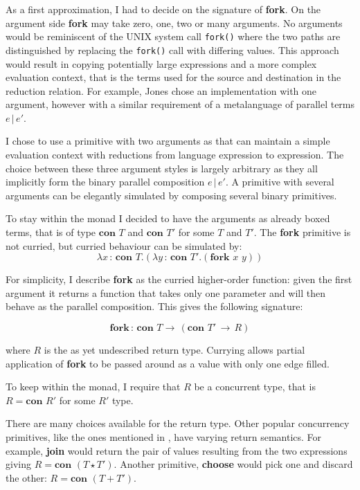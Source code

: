 \documentclass[12pt,twoside,notitlepage]{report}
\theoremstyle{plain}%
\theoremstyle{definition}
\theoremstyle{remark}
\begin{document}
As a first approximation, I had to decide on the signature of \textbf{fork}. On the argument side \textbf{fork} may take zero, one, two or many arguments. No arguments would be reminiscent of the UNIX system call \verb|fork()| where the two paths are distinguished by replacing the \verb|fork()| call with differing values. This approach would result in copying potentially large expressions and a more complex evaluation context, that is the terms used for the source and destination in the reduction relation. For example, Jones\cite{hoareetal2001tackling} chose an implementation with one argument, however with a similar requirement of a metalanguage of parallel terms $ e \, | \, e' $. 


I chose to use a primitive with two arguments as that can maintain a simple evaluation context with reductions from language expression to expression. The choice between these three argument styles is largely arbitrary as they all implicitly form the binary parallel composition $ e \, | \, e' $. A primitive with several arguments can be elegantly simulated by composing several binary primitives.

To stay within the monad I decided to have the arguments as already boxed terms, that is of type $ \textbf{con } T $ and $ \textbf{con } T' $ for some $ T$ and $T' $. The \textbf{fork} primitive is not curried, but curried behaviour can be simulated by:
\[ \lambda x \,:\,\textbf{con }T.(\lambda y \,:\,\textbf{con }T'.(\textbf{fork}\,\,x\,\,y)) \]

For simplicity, I describe \textbf{fork} as the curried higher-order function: given the first argument it returns a function that takes only one parameter and will then behave as the parallel composition. This gives the following signature:

\[ \textbf{fork} \, : \, \textbf{con } T \rightarrow \, (\textbf{con } T'\, \rightarrow\, R ) \tag{T-Fork1} \]  

where $ R $ is the as yet undescribed return type. Currying allows partial application of \textbf{fork} to be passed around as a value with only one edge filled. 

To keep within the monad, I require that $ R $ be a concurrent type, that is $ R =  \textbf{con } R' $ for some $ R' $ type. 

There are many choices available for the return type. Other popular concurrency primitives, like the ones mentioned in , have varying return semantics. For example, \textbf{join} would return the pair of values resulting from the two expressions giving $ R = \textbf{con }(T \star T') $. Another primitive, \textbf{choose} would pick one and discard the other: $ R = \textbf{con }(T + T') $. 
\end{document}
